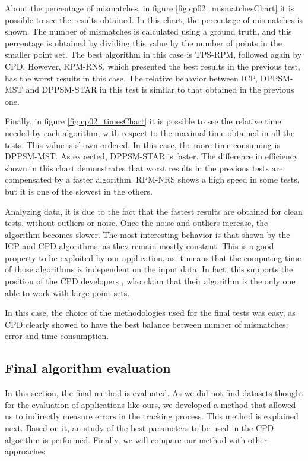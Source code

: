 About the percentage of mismatches, in figure \ref{fig:cp02_mismatchesChart} it is possible to see the results obtained. In 
this chart, the percentage of mismatches is shown. The number of mismatches is calculated using a ground truth, and this 
percentage is obtained by dividing this value by the number of points in the smaller point set. The best algorithm in 
this case is TPS-RPM, followed again by CPD. However, RPM-RNS, which presented the best results in the previous test, 
has the worst results in this case. The relative behavior between ICP, DPPSM-MST and DPPSM-STAR in this test is 
similar to that obtained in the previous one.

Finally, in figure \ref{fig:cp02_timesChart} it is possible to see the relative time needed by each algorithm, with respect to 
the maximal time obtained in all the tests. This value is shown ordered. In this case, the more time consuming is 
DPPSM-MST. As expected, DPPSM-STAR is faster. The difference in efficiency shown in this chart demonstrates that worst 
results in the previous tests are compensated by a faster algorithm. RPM-NRS shows a high speed in some tests, but it is 
one of the slowest in the others. 

Analyzing data, it is due to the fact that the fastest results are obtained for clean 
tests, without outliers or noise. Once the noise and outliers increase, the algorithm becomes slower.
The most interesting behavior is that shown by the ICP and CPD algorithms, as they remain mostly constant. This is a good 
property to be exploited by our application, as it means that the computing time of those algorithms is independent on the input data. In fact, this supports the position of the CPD developers \citep{myronenko2010point}, who claim that their algorithm is 
the only one able to work with large point sets.

In this case, the choice of the methodologies used for the final tests was easy, as CPD clearly showed to have the best balance 
between number of mismatches, error and time consumption.

\subsection{Final algorithm evaluation}\label{ch:chapter02_02_03}

In this section, the final method is evaluated. As we did not find datasets thought for the evaluation of applications like ours, we developed a method that allowed us to indirectly measure errors in the tracking process. This method is explained next. Based on it, an study of the best parameters to be used in the CPD algorithm is performed. Finally, we will compare our method with other approaches.

